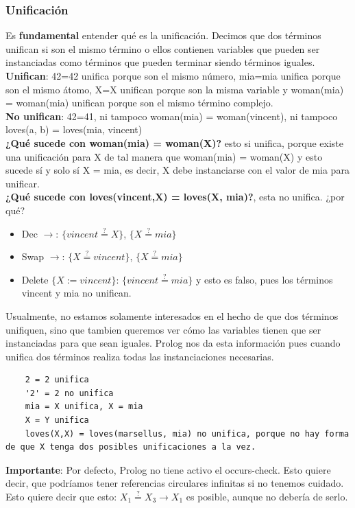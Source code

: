\documentclass[10pt,a4paper]{article}
\begin{document}
\subsubsection*{Unificación}
Es \textbf{fundamental} entender qué es la unificación. Decimos que dos términos unifican si son el mismo término o ellos contienen variables que pueden ser instanciadas como términos que pueden terminar siendo términos iguales. \\
\textbf{Unifican}: 42=42 unifica porque son el mismo número, mia=mia unifica porque son el mismo átomo, X=X unifican porque son la misma variable y woman(mia) = woman(mia) unifican porque son el mismo término complejo. \\
\textbf{No unifican}: 42=41, ni tampoco woman(mia) = woman(vincent), ni tampoco loves(a, b) = loves(mia, vincent) \\
\textbf{¿Qué sucede con woman(mia) = woman(X)?} esto si unifica, porque existe una unificación para X de tal manera que woman(mia) = woman(X) y esto sucede sí y solo sí X = mia, es decir, X debe instanciarse con el valor de mia para unificar. \\
\textbf{¿Qué sucede con loves(vincent,X) = loves(X, mia)?}, esta no unifica. ¿por qué? 
\begin{itemize}
    \item Dec $\rightarrow$: $\{vincent \stackrel{?}{=} X\}$, $\{X\stackrel{?}{=} mia\}$
    \item Swap $\rightarrow$: $\{X \stackrel{?}{=} vincent\}$, $\{X\stackrel{?}{=} mia\}$
    \item Delete $\{X := vincent\}$: $\{vincent \stackrel{?}{=} mia\}$ y esto es falso, pues los términos vincent y mia no unifican.
\end{itemize}
Usualmente, no estamos solamente interesados en el hecho de que dos términos unifiquen, sino que tambien queremos ver cómo las variables tienen que ser instanciadas para que sean iguales. Prolog nos da esta información pues cuando unifica dos términos realiza todas las instanciaciones necesarias. 
\begin{lstlisting}
    2 = 2 unifica 
    '2' = 2 no unifica 
    mia = X unifica, X = mia 
    X = Y unifica 
    loves(X,X) = loves(marsellus, mia) no unifica, porque no hay forma de que X tenga dos posibles unificaciones a la vez.
\end{lstlisting}
\textbf{Importante}: Por defecto, Prolog no tiene activo el occurs-check. Esto quiere decir, que podríamos tener referencias circulares infinitas si no tenemos cuidado. Esto quiere decir que esto: $X_{1} \stackrel{?}{=} X_{3} \rightarrow X_{1}$ es posible, aunque no debería de serlo.
\end{document}
